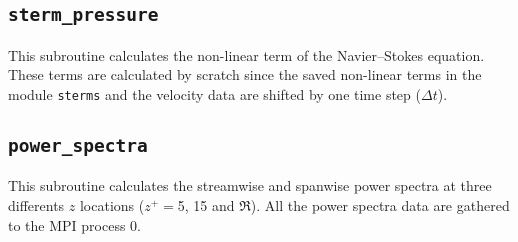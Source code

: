 \subsection{\texttt{sterm\_pressure}}
This subroutine calculates the non-linear term of the Navier--Stokes equation. These terms are calculated by scratch since the saved non-linear terms in the module \texttt{sterms} and the velocity data are shifted by one time step ($\Delta t$). 

\subsection{\texttt{power\_spectra}}
This subroutine calculates the streamwise and spanwise power spectra at three differents $z$ locations ($z^+=$5, 15 and $\Re$). All the power spectra data are gathered to the MPI process 0.


